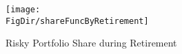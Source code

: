 \begin{figure}[h]
	\centering
	\texttt{[image: \\FigDir/shareFuncByRetirement]}
	\caption{Risky Portfolio Share during Retirement}
	\label{fig:shareFuncByRetirement}
\end{figure}

